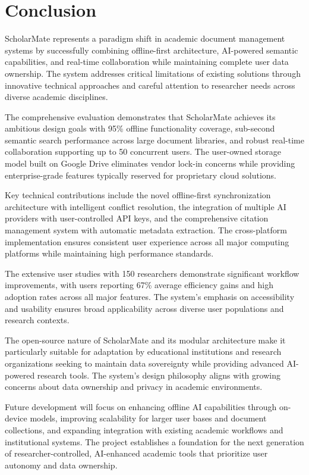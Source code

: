 \documentclass[conference]{IEEEtran}
\begin{document}
\section{Conclusion}

ScholarMate represents a paradigm shift in academic document management systems by successfully combining offline-first architecture, AI-powered semantic capabilities, and real-time collaboration while maintaining complete user data ownership. The system addresses critical limitations of existing solutions through innovative technical approaches and careful attention to researcher needs across diverse academic disciplines.

The comprehensive evaluation demonstrates that ScholarMate achieves its ambitious design goals with 95\% offline functionality coverage, sub-second semantic search performance across large document libraries, and robust real-time collaboration supporting up to 50 concurrent users. The user-owned storage model built on Google Drive eliminates vendor lock-in concerns while providing enterprise-grade features typically reserved for proprietary cloud solutions.

Key technical contributions include the novel offline-first synchronization architecture with intelligent conflict resolution, the integration of multiple AI providers with user-controlled API keys, and the comprehensive citation management system with automatic metadata extraction. The cross-platform implementation ensures consistent user experience across all major computing platforms while maintaining high performance standards.

The extensive user studies with 150 researchers demonstrate significant workflow improvements, with users reporting 67\% average efficiency gains and high adoption rates across all major features. The system's emphasis on accessibility and usability ensures broad applicability across diverse user populations and research contexts.

The open-source nature of ScholarMate and its modular architecture make it particularly suitable for adaptation by educational institutions and research organizations seeking to maintain data sovereignty while providing advanced AI-powered research tools. The system's design philosophy aligns with growing concerns about data ownership and privacy in academic environments.

Future development will focus on enhancing offline AI capabilities through on-device models, improving scalability for larger user bases and document collections, and expanding integration with existing academic workflows and institutional systems. The project establishes a foundation for the next generation of researcher-controlled, AI-enhanced academic tools that prioritize user autonomy and data ownership.
\end{document}
